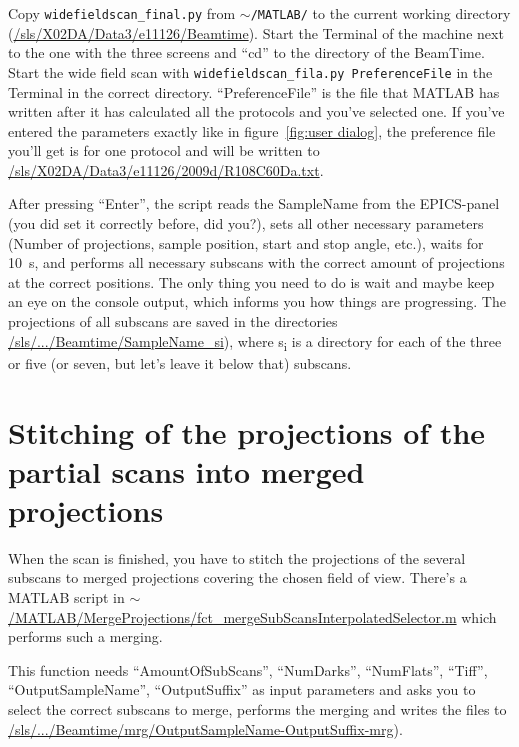 \documentclass[a4paper]{scrartcl}
\begin{document}
Copy \verb+widefieldscan_final.py+ from $\sim$\verb+/MATLAB/+ to the current working directory (\url{/sls/X02DA/Data3/e11126/Beamtime}). Start the Terminal of the machine next to the one with the three screens and ``cd'' to the directory of the BeamTime. Start the wide field scan with \verb+widefieldscan_fila.py PreferenceFile+ in the Terminal in the correct directory. ``PreferenceFile'' is the file that MATLAB has written after it has calculated all the protocols and you've selected one. If you've entered the parameters exactly like in figure~\ref{fig:user dialog}, the preference file you'll get is for one protocol and will be written to \url{/sls/X02DA/Data3/e11126/2009d/R108C60Da.txt}. 

After pressing ``Enter'', the script reads the SampleName from the EPICS-panel (you did set it correctly before, did you?), sets all other necessary parameters (Number of projections, sample position, start and stop angle, etc.), waits for \SI{10}{\second}, and performs all necessary subscans with the correct amount of projections at the correct positions. The only thing you need to do is wait and maybe keep an eye on the console output, which informs you how things are progressing. The projections of all subscans are saved in the directories \url{/sls/.../Beamtime/SampleName_si}), where s\textsubscript{i} is a directory for each of the three or five (or seven, but let's leave it below that) subscans.

\section[Stitching]{Stitching of the projections of the partial scans into merged projections}
When the scan is finished, you have to stitch the projections of the several subscans to merged projections covering the chosen field of view. There's a MATLAB script in $\sim$\url{/MATLAB/MergeProjections/fct_mergeSubScansInterpolatedSelector.m} which performs such a merging.

This function needs ``AmountOfSubScans'', ``NumDarks'', ``NumFlats'', ``Tiff'', ``OutputSampleName'', ``OutputSuffix'' as input parameters and asks you to select the correct subscans to merge, performs the merging and writes the files to \url{/sls/.../Beamtime/mrg/OutputSampleName-OutputSuffix-mrg}). 
\end{document}
